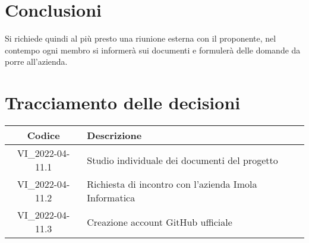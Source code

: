 \section{Conclusioni}
Si richiede quindi al più presto una riunione esterna con il proponente,
nel contempo ogni membro si informerà sui documenti e formulerà delle domande da porre all'azienda.

\newpage

\section*{Tracciamento delle decisioni}
	\renewcommand{\arraystretch}{1.8} %
	\begin{tabular}{ |c|l| }
		\hline
		\textbf{Codice} & \textbf{Descrizione} \\
		\hline
		VI\_2022-04-11.1 & Studio individuale dei documenti del progetto \\ %
		\hline
		VI\_2022-04-11.2 & Richiesta di incontro con l'azienda Imola Informatica \\
		\hline
		VI\_2022-04-11.3 & Creazione account GitHub ufficiale \\
		\hline
	\end{tabular}